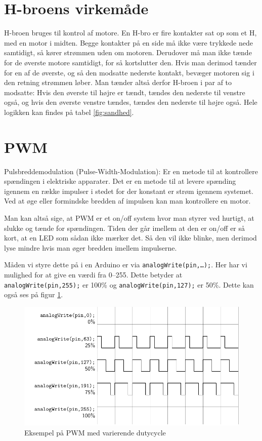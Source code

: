 \documentclass[a4paper,oneside,article,danish,table]{memoir}
\begin{document}
\section{H-broens virkemåde} 
\label{sec:H-broen}
H-broen bruges til kontrol af motore. 
En H-bro er fire kontakter sat op som et H, med en motor i midten. Begge kontakter på en side må ikke være trykkede nede samtidigt, så kører strømmen uden om motoren. Derudover må man ikke tænde for de øverste motore samtidigt, for så kortslutter den. Hvis man derimod tænder for en af de øverste, og så den modsatte nederste kontakt, bevæger motoren sig i den retning strømmen løber. Man tænder altså derfor H-broen i par af to modsatte: Hvis den øverste til højre er tændt, tændes den nederste til venstre også, og hvis den øverste venstre tændes, tændes den nederste til højre også. Hele logikken kan findes på tabel \ref{fig:sandhed}. 
\section{PWM}
Pulsbreddemodulation (Pulse-Width-Modulation): Er en metode til at kontrollere spændingen i elektriske
apparater. Det er en metode til at levere spænding igennem en række impulser i stedet for der konstant er strøm igennem systemet. Ved at øge eller formindske bredden af impulsen kan man kontrollere en motor.

Man kan altså sige, at PWM er et on/off system hvor man styrer ved hurtigt, at slukke og tænde for
spændingen. Tiden der går imellem at den er on/off er så kort, at en LED som sådan ikke mærker det. Så
den vil ikke blinke, men derimod lyse mindre hvis man øger bredden imellem impulserne.

Måden vi styre dette på i en Arduino er via \texttt{analogWrite(pin,\dots);}. Her har vi mulighed for at give en værdi fra 0--255. Dette betyder at \texttt{analogWrite(pin,255);} er 100\% og \texttt{analogWrite(pin,127);} er 50\%. Dette kan også ses på figur \ref{fig:pwm}.
\begin{figure}[htbp]
  \centering
  \includegraphics[width=\textwidth]{pictures/pwm.pdf}
  \caption{Eksempel på PWM med varierende dutycycle}
  \label{fig:pwm}
\end{figure}
\end{document}
